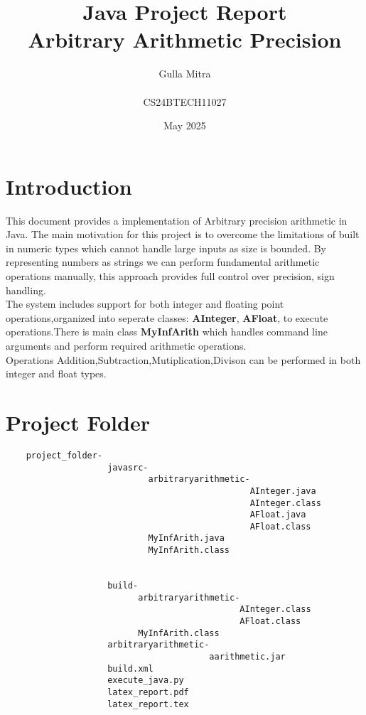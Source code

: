 \documentclass{article}
\title{Java Project Report \\ Arbitrary Arithmetic Precision}
\author{Gulla Mitra \\ \\CS24BTECH11027}
\date{May 2025}
\begin{document}
\maketitle

\section{Introduction}

This document provides a implementation of Arbitrary precision arithmetic in Java. The main motivation for this project is to overcome the limitations of built in numeric types which cannot handle large inputs as size is bounded. By representing numbers as strings we can perform fundamental arithmetic operations manually, this approach provides full control over precision, sign handling.\\

The system includes support for both integer and floating point operations,organized into 
seperate classes: \textbf{AInteger}, \textbf{AFloat}, to execute operations.There is main class \textbf{MyInfArith} which handles command line arguments and perform required arithmetic operations.\\

Operations Addition,Subtraction,Mutiplication,Divison can be performed in both integer and float types. \\

\section{Project Folder}

\begin{verbatim}
    project_folder-
                    javasrc-
                            arbitraryarithmetic-
                                                AInteger.java
                                                AInteger.class
                                                AFloat.java
                                                AFloat.class
                            MyInfArith.java
                            MyInfArith.class

                            
                    build-
                          arbitraryarithmetic-
                                              AInteger.class
                                              AFloat.class
                          MyInfArith.class
                    arbitraryarithmetic-
                                        aarithmetic.jar
                    build.xml
                    execute_java.py
                    latex_report.pdf
                    latex_report.tex
                    
\end{verbatim}
\end{document}
